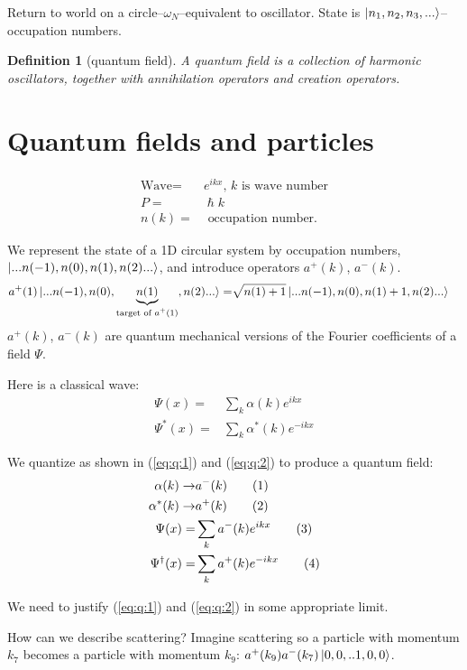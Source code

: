 \documentclass[]{article}
\newcommand\numberthis{\addtocounter{equation}{1}\tag{\theequation}}
\newtheorem{defn}[thm]{Definition}
\begin{document}
Return to world on a circle--$\omega_N$--equivalent to oscillator. State is $\ket{n_1,n_2, n_3,...}$--occupation numbers. 
\begin{defn}[quantum field]
	A quantum field is a collection of harmonic oscillators, together with annihilation operators and creation operators.
\end{defn}

\section{Quantum fields and particles}

\begin{align*}
\text{Wave} =& e^{i k x} \text{, $k$ is wave number}\\
P=&\hslash k\\
n(k) =& \text{ occupation number.}
\end{align*}

We represent the state of a 1D circular system by occupation numbers, $\ket{...n(-1), n(0), n(1), n(2)...}$, and introduce operators $a^+(k)$, $a^-(k)$. 
\begin{align*}
a^+(1)\ket{...n(-1), n(0), \underbrace{n(1)}_\text{target of $a^+(1)$}, n(2)...}=& \sqrt{n(1)+1}\ket{...n(-1), n(0), n(1)+1, n(2)...}
\end{align*}
$a^+(k)$, $a^-(k)$ are quantum mechanical versions of the Fourier coefficients of a field $\Psi$.

Here is a classical wave:
\begin{align*}
\Psi(x) =& \sum_k \alpha(k) e^{ikx}\\
\Psi^*(x) =& \sum_k \alpha^*(k) e^{-ikx}
\end{align*}

We quantize as shown in (\ref{eq:q:1}) and (\ref{eq:q:2}) to produce a quantum field:
\begin{align*}
\alpha(k) \rightarrow& a^-(k) \numberthis \label{eq:q:1}\\
\alpha^*(k) \rightarrow& a^+(k) \numberthis \label{eq:q:2}\\
\Psi(x) =& \sum_k a^-(k) e^{ikx} \numberthis \label{eq:Psi}\\
\Psi^\dagger(x) =& \sum_k a^+(k) e^{-ikx} \numberthis \label{eq:Psi:dagger}
\end{align*}

We need to justify (\ref{eq:q:1}) and (\ref{eq:q:2}) in some appropriate limit.

How can we describe scattering? Imagine scattering so a particle with momentum $k_7$ becomes a particle with momentum $k_9$: $a^+(k_9)a^-(k_7)\ket{0,0,..1,0,0}$.
\end{document}
